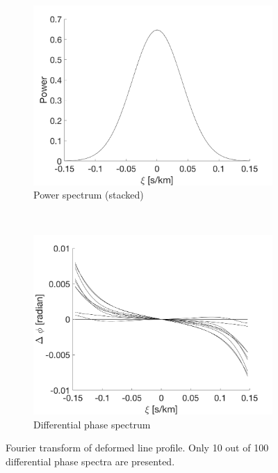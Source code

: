 \begin{figure}[tbp]	
    \begin{subfigure}[b]{0.49\textwidth}
        \includegraphics[width=\textwidth]{./Figures/Methods/LPD2-FT_power.png}
        \caption{Power spectrum (stacked)}
    \end{subfigure}
	~
    \begin{subfigure}[b]{0.49\textwidth}
        \includegraphics[width=\textwidth]{./Figures/Methods/LPD4-Relative_phase_angle.png}
        \caption{Differential phase spectrum}
        \label{fig:dps_LPD}
    \end{subfigure}	
    
    \caption[Fourier transform of deformed line profile]
    {Fourier transform of deformed line profile. Only 10 out of 100 differential phase spectra are presented.}
\label{fig:FT_process_LPD}
\end{figure}    

